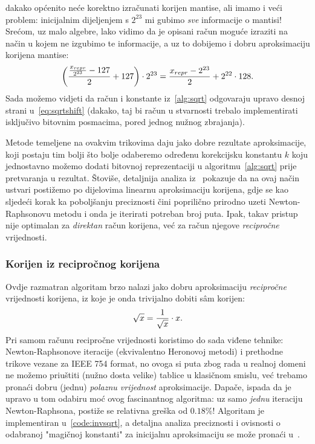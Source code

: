 \documentclass[12pt]{scrartcl}
\begin{document}
dakako općenito neće korektno izračunati korijen mantise, ali imamo i veći problem: inicijalnim dijeljenjem s $2^{23}$ mi gubimo \emph{sve} informacije
o mantisi! Srećom, uz malo algebre, lako vidimo da je opisani račun moguće izraziti na način u kojem ne izgubimo te informacije, a uz to dobijemo
i dobru aproksimaciju korijena mantise:
\begin{equation}\label{eq:sqrtshift}
    \left(\frac{\frac{x_{repr}}{2^{23}} - 127}{2} + 127\right) \cdot 2^{23} = \frac{x_{repr} - 2^{23}}{2} + 2^{22}\cdot 128\text.
\end{equation}
Sada možemo vidjeti da račun i konstante iz~\ref{alg:sqrt} odgovaraju upravo desnoj strani u~\eqref{eq:sqrtshift} (dakako, taj bi račun u 
stvarnosti trebalo implementirati isključivo bitovnim posmacima, pored jednog nužnog zbrajanja).

Metode temeljene na ovakvim trikovima daju jako dobre rezultate aproksimacije, koji postaju tim bolji što bolje odaberemo
određenu korekcijsku konstantu $k$ koju jednostavno možemo dodati bitovnoj reprezentaciji u 
algoritmu~\ref{alg:sqrt} prije pretvaranja u rezultat. Štoviše, detaljnija analiza iz~\cite{lomont} 
 pokazuje da na ovaj način ustvari postižemo po dijelovima linearnu aproksimaciju korijena, gdje se kao sljedeći korak ka poboljšanju
 preciznosti čini poprilično prirodno uzeti Newton-Raphsonovu metodu i onda je iterirati potreban broj puta. Ipak, takav pristup nije optimalan
 za \emph{direktan} račun korijena, već za račun njegove \emph{recipročne} vrijednosti.

\subsubsection{Korijen iz recipročnog korijena}
Ovdje razmatran
algoritam brzo nalazi jako dobru aproksimaciju \emph{recipročne} vrijednosti korijena, iz koje je onda trivijalno dobiti s\^am korijen:
\begin{equation}
    \sqrt{x} = \frac{1}{\sqrt{x}} \cdot x\text.
\end{equation}
Pri samom računu recipročne vrijednosti koristimo do sada viđene tehnike: Newton-Raphsonove iteracije (ekvivalentno Heronovoj metodi) i prethodne
trikove vezane za IEEE 754 format, no ovoga si puta zbog rada u realnoj domeni ne možemo priuštiti (nužno dosta velike) tablice u klasičnom smislu,
već trebamo pronaći dobru (jednu)
\emph{polaznu vrijednost} aproksimacije. Dapače, ispada da je upravo u tom odabiru moć ovog fascinantnog algoritma: uz samo \emph{jednu} iteraciju
Newton-Raphsona, postiže se relativna greška od $0.18\%$! Algoritam je implementiran u~\autoref{code:invsqrt}, a detaljna analiza preciznosti i ovisnosti
o odabranoj "magičnoj konstanti" za inicijalnu aproksimaciju se može pronaći u~\cite{lomont}.
\end{document}
